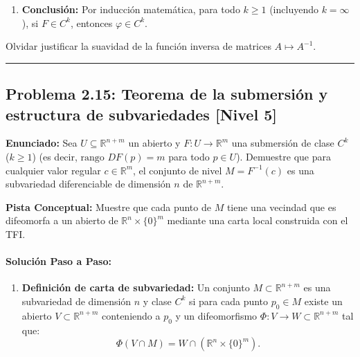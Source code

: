 \documentclass[11pt,a4paper]{article}
\begin{document}
\begin{enumerate}[label=\textbf{\arabic*.}]
\item \textbf{Conclusión:} Por inducción matemática, para todo $k \ge 1$ (incluyendo $k = \infty$), si $F \in C^k$, entonces $\varphi \in C^k$.
\end{enumerate}

\begin{trapbox}
Olvidar justificar la suavidad de la función inversa de matrices $A \mapsto A^{-1}$.
\end{trapbox}

\vspace{0.5cm}
\hrule
\vspace{0.5cm}

\subsection*{Problema 2.15: Teorema de la submersión y estructura de subvariedades \hfill \color{primaryblue}\small[Nivel 5]}

\begin{tcolorbox}[colback=white,colframe=gray!40,arc=1mm,boxrule=0.5pt,left=3mm,right=3mm,top=2mm,bottom=2mm]
\textbf{Enunciado:} Sea $U \subseteq \mathbb{R}^{n+m}$ un abierto y $F: U \to \mathbb{R}^m$ una submersión de clase $C^k$ ($k \ge 1$) (es decir, $\text{rango } DF(p) = m$ para todo $p \in U$). Demuestre que para cualquier valor regular $c \in \mathbb{R}^m$, el conjunto de nivel $M = F^{-1}(c)$ es una subvariedad diferenciable de dimensión $n$ de $\mathbb{R}^{n+m}$.
\end{tcolorbox}

\begin{tcolorbox}[colback=yellow!4,colframe=accentamber!70,arc=1mm,boxrule=0.5pt,left=3mm,right=3mm,top=1.5mm,bottom=1.5mm]
\textbf{Pista Conceptual:} Muestre que cada punto de $M$ tiene una vecindad que es difeomorfa a un abierto de $\mathbb{R}^n \times \{0\}^m$ mediante una carta local construida con el TFI.
\end{tcolorbox}

\paragraph{Solución Paso a Paso:}\par
\begin{enumerate}[label=\textbf{\arabic*.}]
\item \textbf{Definición de carta de subvariedad:}
Un conjunto $M \subset \mathbb{R}^{n+m}$ es una subvariedad de dimensión $n$ y clase $C^k$ si para cada punto $p_0 \in M$ existe un abierto $V \subset \mathbb{R}^{n+m}$ conteniendo a $p_0$ y un difeomorfismo $\Phi: V \to W \subset \mathbb{R}^{n+m}$ tal que:
\begin{equation*}
\Phi(V \cap M) = W \cap (\mathbb{R}^n \times \{0\}^m).
\end{equation*}
\end{enumerate}
\end{document}
